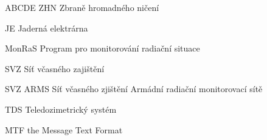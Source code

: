 \begin{seznamzkratek}{ABCDE}
	      {ZHN}
	      {Zbraně hromadného ničení}
	     	     	  
	      {JE}
	      {Jaderná elektrárna}
	     	  
	      {MonRaS}
	      {Program pro monitorování radiační situace}
	     	  
	      {SVZ}
	      {Síť včasného zajištění}
	     	  
	      {SVZ ARMS}
	      {Síť včasného zjištění Armádní radiační monitorovací sítě}
	      
	      {TDS}
	      {Teledozimetrický systém}	   
	      
	      {MTF}
	      {the Message Text Format}	         
	      	            	      

\end{seznamzkratek}
